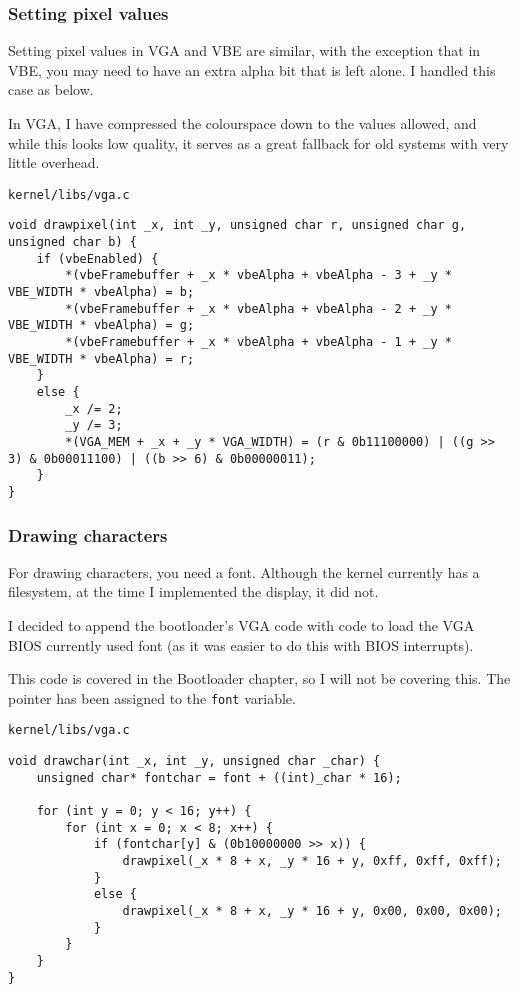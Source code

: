 \documentclass{article}
\begin{document}
\subsubsection{Setting pixel values}

Setting pixel values in VGA and VBE are similar, with the exception
that in VBE, you may need to have an extra alpha bit that is left alone.
I handled this case as below.

In VGA, I have compressed the colourspace down to the values allowed,
and while this looks low quality, it serves as a great fallback
for old systems with very little overhead.

\begin{verbatim}
kernel/libs/vga.c
\end{verbatim}
\begin{verbatim}
void drawpixel(int _x, int _y, unsigned char r, unsigned char g, unsigned char b) {
	if (vbeEnabled) {
		*(vbeFramebuffer + _x * vbeAlpha + vbeAlpha - 3 + _y * VBE_WIDTH * vbeAlpha) = b;
		*(vbeFramebuffer + _x * vbeAlpha + vbeAlpha - 2 + _y * VBE_WIDTH * vbeAlpha) = g;
		*(vbeFramebuffer + _x * vbeAlpha + vbeAlpha - 1 + _y * VBE_WIDTH * vbeAlpha) = r;
	}
	else {
		_x /= 2;
		_y /= 3;
		*(VGA_MEM + _x + _y * VGA_WIDTH) = (r & 0b11100000) | ((g >> 3) & 0b00011100) | ((b >> 6) & 0b00000011);
	}
}
\end{verbatim}

\subsubsection{Drawing characters}

For drawing characters, you need a font. Although the kernel
currently has a filesystem, at the time I implemented the display,
it did not.

I decided to append the bootloader's VGA code with code to
load the VGA BIOS currently used font (as it was easier
to do this with BIOS interrupts).

This code is covered in the Bootloader chapter, so I will not
be covering this. The pointer has been assigned to the \verb|font|
variable.

\begin{verbatim}
kernel/libs/vga.c
\end{verbatim}
\begin{verbatim}
void drawchar(int _x, int _y, unsigned char _char) {
	unsigned char* fontchar = font + ((int)_char * 16);

	for (int y = 0; y < 16; y++) {
		for (int x = 0; x < 8; x++) {
			if (fontchar[y] & (0b10000000 >> x)) {
				drawpixel(_x * 8 + x, _y * 16 + y, 0xff, 0xff, 0xff);
			}
			else {
				drawpixel(_x * 8 + x, _y * 16 + y, 0x00, 0x00, 0x00);
			}
		}
	}
}
\end{verbatim}
\end{document}
